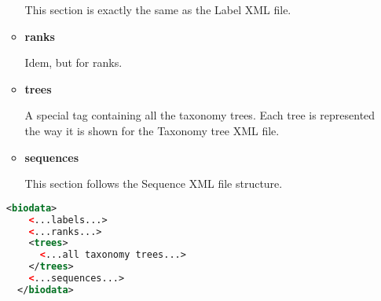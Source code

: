 \begin{itemize}
\begin{itemize}
    This section is exactly the same as the Label XML file.
    
    \item \textbf{ranks}
    
    Idem, but for ranks.
    
    \item \textbf{trees}
    
    A special tag containing all the taxonomy trees. Each tree is represented the way it is shown for the Taxonomy tree XML file.
    
    \item \textbf{sequences}
    
    This section follows the Sequence XML file structure.
    
  \end{itemize}

  \begin{lstlisting}[float, language=xml, frame=single, label=DatabaseXmlFile, caption={Database in XML skeleton.}]
  <biodata>
    <...labels...>
    <...ranks...>
    <trees>
      <...all taxonomy trees...>
    </trees>
    <...sequences...>
  </biodata>
  \end{lstlisting}

\end{itemize}